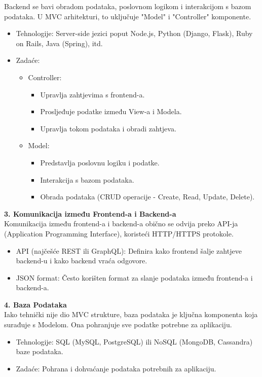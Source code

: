 Backend se bavi obradom podataka, poslovnom logikom i interakcijom s bazom podataka. U MVC arhitekturi, to uključuje "Model" i "Controller" komponente.
\begin{itemize}
		  \item {Tehnologije: Server-side jezici poput Node.js, Python (Django, Flask), Ruby on Rails, Java (Spring), itd.}
		  \item { Zadaće:
            \begin{itemize}
		  \item { Controller:
                    \begin{itemize}
		  \item {Upravlja zahtjevima s frontend-a.}
		  \item {Prosljeđuje podatke između View-a i Modela.}	
            \item {Upravlja tokom podataka i obradi zahtjeva.}
	   \end{itemize}}
        \item { Model:
                    \begin{itemize}
		  \item {Predstavlja poslovnu logiku i podatke.}
		  \item {Interakcija s bazom podataka.}	
            \item {Obrada podataka (CRUD operacije - Create, Read, Update, Delete).}
	   \end{itemize}}
	   \end{itemize}}	
	   \end{itemize}


 \textbf{3. Komunikacija između Frontend-a i Backend-a}\\

Komunikacija između frontend-a i backend-a obično se odvija preko API-ja (Application Programming Interface), koristeći HTTP/HTTPS protokole.
\begin{itemize}
		  \item {API (najčešće REST ili GraphQL): Definira kako frontend šalje zahtjeve backend-u i kako backend vraća odgovore.}
		  \item {JSON format: Često korišten format za slanje podataka između frontend-a i backend-a.}	
	   \end{itemize}


 \textbf{4. Baza Podataka}\\

Iako tehnički nije dio MVC strukture, baza podataka je ključna komponenta koja surađuje s Modelom. Ona pohranjuje sve podatke potrebne za aplikaciju.
\begin{itemize}
		  \item {Tehnologije: SQL (MySQL, PostgreSQL) ili NoSQL (MongoDB, Cassandra) baze podataka.}
		  \item {Zadaće: Pohrana i dohvaćanje podataka potrebnih za aplikaciju.}	
	   \end{itemize}

